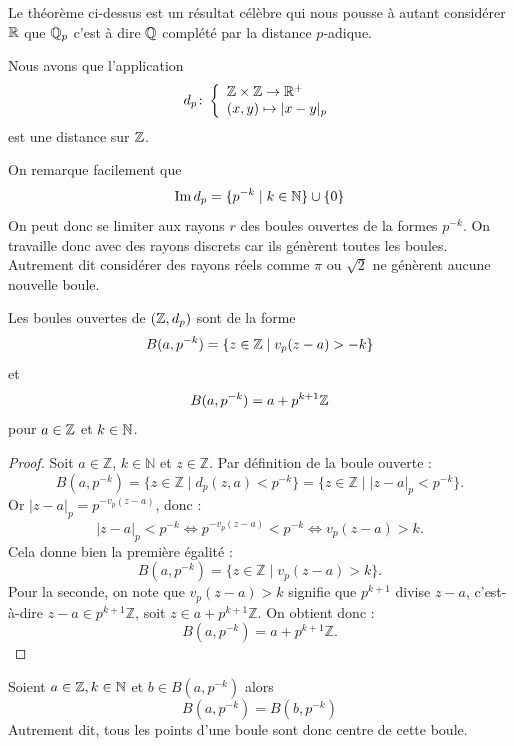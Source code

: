 \begin{remarque}
    Le théorème ci-dessus est un résultat célèbre qui nous pousse à autant considérer $\mathbb{R}$ que $\mathbb{Q}_p$ c'est à dire $\mathbb{Q}$ complété par la distance $p$-adique.
\end{remarque}

\begin{proposition}
    Nous avons que l'application
    \[
    d_p\colon \left\{\begin{array}{l}\mathbb{Z}\times \mathbb{Z} \to \mathbb{R}^+ \\(x,y)\mapsto |x-y|_p\end{array}\right.
    \]
    est une distance sur $\mathbb{Z}$.
\end{proposition}

\begin{remarque}
    On remarque facilement que $$\operatorname{Im}d_p= \{p^{-
    k}\mid k\in \mathbb{N}\}\cup \{0\}$$
    On peut donc se limiter aux rayons $r$ des boules ouvertes de la formes $p^{-k}$. On travaille donc avec des rayons discrets car ils génèrent toutes les boules. Autrement dit considérer des rayons réels comme $\pi$ ou $\sqrt{2}$ ne génèrent aucune nouvelle boule.  
\end{remarque}
 
\begin{proposition}
    Les boules ouvertes de $(\mathbb{Z},d_p)$ sont de la forme
    \[
    B(a,p^{-k})=\{z\in \mathbb{Z}\mid v_p(z-a)>-k\}
    \]
    et
    \[
    B(a,p^{-k})=a+p ^{k+1}\mathbb{Z}
    \]
    pour $a\in \mathbb{Z}$ et $k\in \mathbb{N}$.
\end{proposition}

\begin{proof}
Soit $a \in \mathbb{Z}$, $k \in \mathbb{N}$ et $z \in \mathbb{Z}$. Par définition de la boule ouverte :
$$B(a, p^{-k}) = \{z \in \mathbb{Z} \mid d_p(z, a) < p^{-k}\} = \{z \in \mathbb{Z} \mid |z - a|_p < p^{-k}\}.$$
Or $|z - a|_p = p^{-v_p(z-a)}$, donc :
$$|z - a|_p < p^{-k} \iff p^{-v_p(z-a)} < p^{-k} \iff v_p(z - a) > k.$$
Cela donne bien la première égalité :
$$B(a, p^{-k}) = \{z \in \mathbb{Z} \mid v_p(z - a) > k\}.$$
Pour la seconde, on note que $v_p(z - a) > k$ signifie que $p^{k+1}$ divise $z - a$, c'est-à-dire $z - a \in p^{k+1}\mathbb{Z}$, soit $z \in a + p^{k+1}\mathbb{Z}$. On obtient donc :
$$B(a, p^{-k}) = a + p^{k+1}\mathbb{Z}.$$
\end{proof}

\begin{proposition}
    Soient $a\in \mathbb{Z},k \in \mathbb{N}$ et $b\in B(a, p^{-k})$ alors
    \[
    B(a, p^{-k})=B(b,p^{-k})
    \]
    Autrement dit, tous les points d’une boule sont donc centre de cette boule.
\end{proposition}


